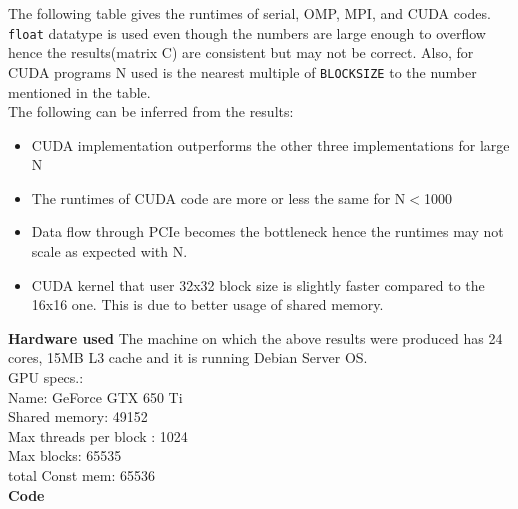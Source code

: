 \documentclass{article}
\begin{document}
The following table gives the runtimes of serial, OMP, MPI, and CUDA codes.
\verb|float| datatype is used even though the numbers are large enough
to overflow hence the results(matrix C) are consistent but may not be correct. Also, 
for CUDA programs N used is the nearest multiple of \verb|BLOCKSIZE| to the
number mentioned in the table. \\
\newpage
The following can be inferred from the results:
\begin{itemize}
	\item CUDA implementation outperforms the other three implementations for large N

	\item The runtimes of CUDA code are more or less the same for N$<$1000
	\item Data flow through PCIe becomes the bottleneck hence the runtimes may not
		scale as expected with N.   
	\item CUDA kernel that user 32x32 block size is slightly faster compared 
		to the 16x16 one. This is due to better usage of shared memory.
\end{itemize}
\textbf{Hardware used}
The machine on which the above results were produced has 24 cores, 15MB L3 cache and it is running Debian Server OS.\\
GPU specs.: \\
Name: GeForce GTX 650 Ti \\
Shared memory: 49152 \\
Max threads per block : 1024 \\
Max blocks: 65535 \\
total Const mem: 65536 \\

\newpage
\textbf{Code}

\end{document}

